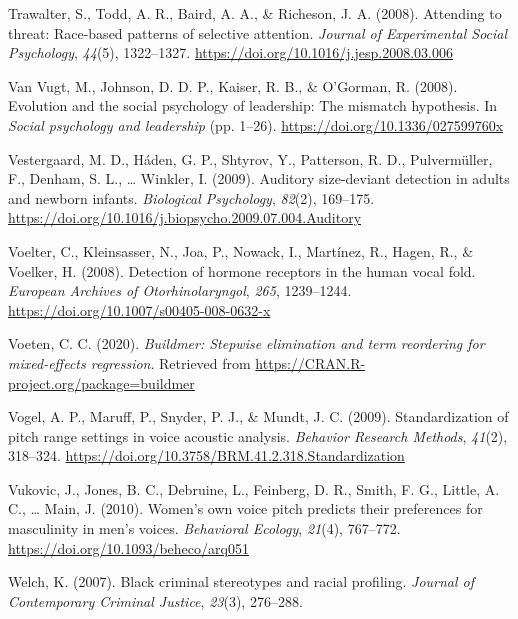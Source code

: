 \documentclass[
  english,
  man, noextraspace,floatsintext]{apa6}
\newlength{\cslhangindent}
\newenvironment{cslreferences}%
  {\setlength{\parindent}{0pt}%
  \everypar{\setlength{\hangindent}{\cslhangindent}}\ignorespaces}%
  {\par}
\begin{document}
\begin{cslreferences}
\leavevmode\hypertarget{ref-Trawalter2008}{}%
Trawalter, S., Todd, A. R., Baird, A. A., \& Richeson, J. A. (2008). Attending to threat: Race-based patterns of selective attention. \emph{Journal of Experimental Social Psychology}, \emph{44}(5), 1322--1327. \url{https://doi.org/10.1016/j.jesp.2008.03.006}

\leavevmode\hypertarget{ref-VanVugt2008}{}%
Van Vugt, M., Johnson, D. D. P., Kaiser, R. B., \& O'Gorman, R. (2008). Evolution and the social psychology of leadership: The mismatch hypothesis. In \emph{Social psychology and leadership} (pp. 1--26). \url{https://doi.org/10.1336/027599760x}

\leavevmode\hypertarget{ref-Vestergaard2009}{}%
Vestergaard, M. D., Háden, G. P., Shtyrov, Y., Patterson, R. D., Pulvermüller, F., Denham, S. L., \ldots{} Winkler, I. (2009). Auditory size-deviant detection in adults and newborn infants. \emph{Biological Psychology}, \emph{82}(2), 169--175. \url{https://doi.org/10.1016/j.biopsycho.2009.07.004.Auditory}

\leavevmode\hypertarget{ref-Voelter2008}{}%
Voelter, C., Kleinsasser, N., Joa, P., Nowack, I., Martínez, R., Hagen, R., \& Voelker, H. (2008). Detection of hormone receptors in the human vocal fold. \emph{European Archives of Otorhinolaryngol}, \emph{265}, 1239--1244. \url{https://doi.org/10.1007/s00405-008-0632-x}

\leavevmode\hypertarget{ref-R-buildmer}{}%
Voeten, C. C. (2020). \emph{Buildmer: Stepwise elimination and term reordering for mixed-effects regression}. Retrieved from \url{https://CRAN.R-project.org/package=buildmer}

\leavevmode\hypertarget{ref-Vogel2009}{}%
Vogel, A. P., Maruff, P., Snyder, P. J., \& Mundt, J. C. (2009). Standardization of pitch range settings in voice acoustic analysis. \emph{Behavior Research Methods}, \emph{41}(2), 318--324. \url{https://doi.org/10.3758/BRM.41.2.318.Standardization}

\leavevmode\hypertarget{ref-Vukovic2010}{}%
Vukovic, J., Jones, B. C., Debruine, L., Feinberg, D. R., Smith, F. G., Little, A. C., \ldots{} Main, J. (2010). Women's own voice pitch predicts their preferences for masculinity in men's voices. \emph{Behavioral Ecology}, \emph{21}(4), 767--772. \url{https://doi.org/10.1093/beheco/arq051}

\leavevmode\hypertarget{ref-Welch2007}{}%
Welch, K. (2007). Black criminal stereotypes and racial profiling. \emph{Journal of Contemporary Criminal Justice}, \emph{23}(3), 276--288.


\end{cslreferences}
\end{document}
